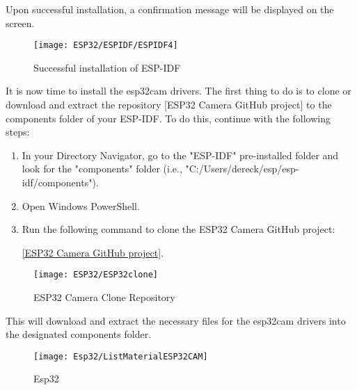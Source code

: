 Upon successful installation, a confirmation message will be displayed on the screen.
\begin{figure}[H]   
    \centering
    \texttt{[image: ESP32/ESPIDF/ESPIDF4]}
    \caption{Successful installation of  ESP-IDF} 
\end{figure}


It is now time to install the esp32cam drivers. The first thing to do is to clone or download and extract the repository [ESP32 Camera GitHub project] to the components folder of your ESP-IDF. To do this, continue with the following steps:

\begin{enumerate}
    \item In your Directory Navigator, go to the "ESP-IDF" pre-installed folder and look for the "components" folder (i.e., "C:/Users/dereck/esp/esp-idf/components").
    
    \item Open Windows PowerShell.
    
    \item Run the following command to clone the ESP32 Camera GitHub project:
    
    \href{https://github.com/espressif/esp32-camera}{[ESP32 Camera GitHub project]}.
    
    
\end{enumerate}


\begin{figure}[H]   
    \centering
    \texttt{[image: ESP32/ESP32clone]}
    \caption{ESP32 Camera Clone Repository} 
\end{figure}

This will download and extract the necessary files for the esp32cam drivers into the designated components folder.




\begin{figure}
	\texttt{[image: Esp32/ListMaterialESP32CAM]}
	\caption{Esp32}
	\label{fig:arduino}
\end{figure}






